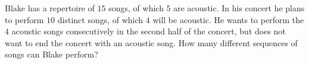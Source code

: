 Blake has a repertoire of $15$ songs, of which $5$ are acoustic. In his concert he plans to perform $10$ distinct songs, of which $4$ will be acoustic. He wants to perform the $4$ acoustic songs consecutively in the second half of the concert, but does not want to end the concert with an acoustic song. How many different sequences of songs can Blake perform?
